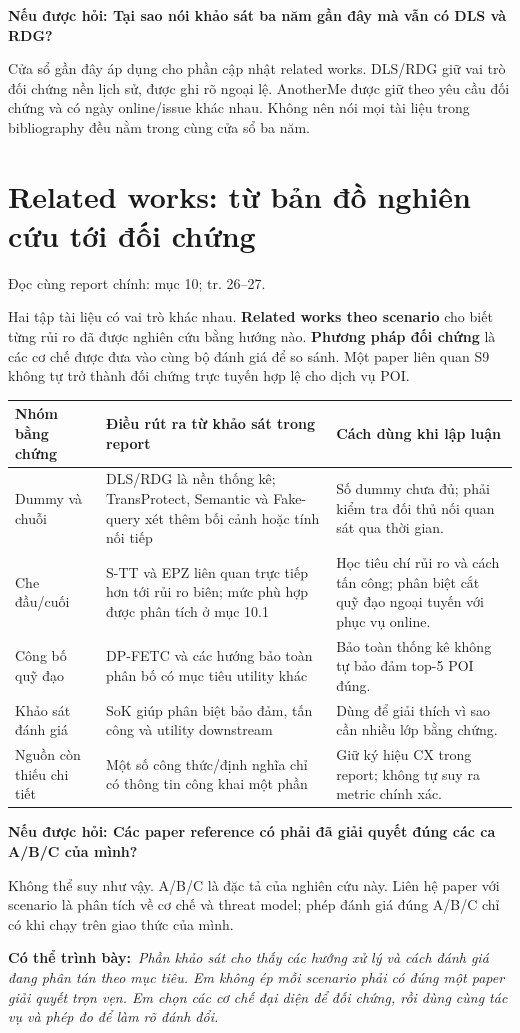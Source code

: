 \documentclass[10pt,a4paper]{article}
\newcommand{\say}[1]{\par\textbf{Có thể trình bày:}\ \textit{#1}\par}
\newcommand{\ask}[2]{\par\textbf{Nếu được hỏi: #1}\par #2\par}
\newcommand{\where}[1]{\par{\small\color{gray}Đọc cùng report chính: #1.}\par}
\newcommand{\guidepage}[1]{\clearpage\section{#1}}
\begin{document}
\ask{Tại sao nói khảo sát ba năm gần đây mà vẫn có DLS và RDG?}{Cửa sổ gần đây áp dụng cho phần cập nhật related works. DLS/RDG giữ vai trò đối chứng nền lịch sử, được ghi rõ ngoại lệ. AnotherMe được giữ theo yêu cầu đối chứng và có ngày online/issue khác nhau. Không nên nói mọi tài liệu trong bibliography đều nằm trong cùng cửa sổ ba năm.}

\guidepage{Related works: từ bản đồ nghiên cứu tới đối chứng}
\where{mục 10; tr. 26--27}
Hai tập tài liệu có vai trò khác nhau. \textbf{Related works theo scenario} cho biết từng rủi ro đã được nghiên cứu bằng hướng nào. \textbf{Phương pháp đối chứng} là các cơ chế được đưa vào cùng bộ đánh giá để so sánh. Một paper liên quan S9 không tự trở thành đối chứng trực tuyến hợp lệ cho dịch vụ POI.

\begin{longtable}{@{}P{3.5cm}P{6.1cm}P{6.6cm}@{}}
\toprule Nhóm bằng chứng & Điều rút ra từ khảo sát trong report & Cách dùng khi lập luận\\\midrule
Dummy và chuỗi & DLS/RDG là nền thống kê; TransProtect, Semantic và Fake-query xét thêm bối cảnh hoặc tính nối tiếp & Số dummy chưa đủ; phải kiểm tra đối thủ nối quan sát qua thời gian.\\[4pt]
Che đầu/cuối & S-TT và EPZ liên quan trực tiếp hơn tới rủi ro biên; mức phù hợp được phân tích ở mục 10.1 & Học tiêu chí rủi ro và cách tấn công; phân biệt cắt quỹ đạo ngoại tuyến với phục vụ online.\\[4pt]
Công bố quỹ đạo & DP-FETC và các hướng bảo toàn phân bố có mục tiêu utility khác & Bảo toàn thống kê không tự bảo đảm top-5 POI đúng.\\[4pt]
Khảo sát đánh giá & SoK giúp phân biệt bảo đảm, tấn công và utility downstream & Dùng để giải thích vì sao cần nhiều lớp bằng chứng.\\[4pt]
Nguồn còn thiếu chi tiết & Một số công thức/định nghĩa chỉ có thông tin công khai một phần & Giữ ký hiệu CX trong report; không tự suy ra metric chính xác.\\
\bottomrule
\end{longtable}

\ask{Các paper reference có phải đã giải quyết đúng các ca A/B/C của mình?}{Không thể suy như vậy. A/B/C là đặc tả của nghiên cứu này. Liên hệ paper với scenario là phân tích về cơ chế và threat model; phép đánh giá đúng A/B/C chỉ có khi chạy trên giao thức của mình.}
\say{Phần khảo sát cho thấy các hướng xử lý và cách đánh giá đang phân tán theo mục tiêu. Em không ép mỗi scenario phải có đúng một paper giải quyết trọn vẹn. Em chọn các cơ chế đại diện để đối chứng, rồi dùng cùng tác vụ và phép đo để làm rõ đánh đổi.}
\end{document}
